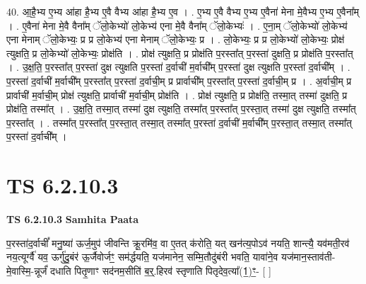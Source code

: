 \documentclass[17pt]{extarticle}
\begin{document}
40. आ॒है॒भ्य ए॒भ्य आ॑हा है॒भ्य ए॒वै वैभ्य आ॑हा है॒भ्य ए॒व । . ए॒भ्य ए॒वै वैभ्य ए॒भ्य ए॒वैना॑ मेना मे॒वैभ्य ए॒भ्य ए॒वैना᳚म् । . ए॒वैना॑ मेना मे॒वै वैना᳚म् ॅलो॒केभ्यो॑ लो॒केभ्य॑ एना मे॒वै वैना᳚म् ॅलो॒केभ्यः॑ । . ए॒ना॒म् ॅलो॒केभ्यो॑ लो॒केभ्य॑ एना मेनाम् ॅलो॒केभ्यः॒ प्र प्र लो॒केभ्य॑ एना मेनाम् ॅलो॒केभ्यः॒ प्र । . लो॒केभ्यः॒ प्र प्र लो॒केभ्यो॑ लो॒केभ्यः॒ प्रोक्ष॑ त्युक्षति॒ प्र लो॒केभ्यो॑ लो॒केभ्यः॒ प्रोक्ष॑ति । . प्रोक्ष॑ त्युक्षति॒ प्र प्रोक्ष॑ति प॒रस्ता᳚त् प॒रस्ता॑ दुक्षति॒ प्र प्रोक्ष॑ति प॒रस्ता᳚त् । . उ॒क्ष॒ति॒ प॒रस्ता᳚त् प॒रस्ता॑ दुक्ष त्युक्षति प॒रस्ता॑ द॒र्वाची॑ म॒र्वाची᳚म् प॒रस्ता॑ दुक्ष त्युक्षति प॒रस्ता॑ द॒र्वाची᳚म् । . प॒रस्ता॑ द॒र्वाची॑ म॒र्वाची᳚म् प॒रस्ता᳚त् प॒रस्ता॑ द॒र्वाची॒म् प्र प्रार्वाची᳚म् प॒रस्ता᳚त् प॒रस्ता॑ द॒र्वाची॒म् प्र । . अ॒र्वाची॒म् प्र प्रार्वाची॑ म॒र्वाची॒म् प्रोक्ष॑ त्युक्षति॒ प्रार्वाची॑ म॒र्वाची॒म् प्रोक्ष॑ति । . प्रोक्ष॑ त्युक्षति॒ प्र प्रोक्ष॑ति॒ तस्मा॒त् तस्मा॑ दुक्षति॒ प्र प्रोक्ष॑ति॒ तस्मा᳚त् । . उ॒क्ष॒ति॒ तस्मा॒त् तस्मा॑ दुक्ष त्युक्षति॒ तस्मा᳚त् प॒रस्ता᳚त् प॒रस्ता॒त् तस्मा॑ दुक्ष त्युक्षति॒ तस्मा᳚त् प॒रस्ता᳚त् । . तस्मा᳚त् प॒रस्ता᳚त् प॒रस्ता॒त् तस्मा॒त् तस्मा᳚त् प॒रस्ता॑ द॒र्वाची॑ म॒र्वाची᳚म् प॒रस्ता॒त् तस्मा॒त् तस्मा᳚त् प॒रस्ता॑ द॒र्वाची᳚म् । \newline
\pagebreak
{}

\section{ TS 6.2.10.3 }

\textbf{TS 6.2.10.3 } \newline
\textbf{Samhita Paata} \newline

प॒रस्ता॑द॒र्वाचीं᳚ मनु॒ष्या॑ ऊर्ज॒मुप॑ जीवन्ति क्रू॒रमि॑व॒ वा ए॒तत् क॑रोति॒ यत् खन॑त्य॒पोऽव॑ नयति॒ शान्त्यै॒ यव॑मती॒रव॑ नय॒त्यूर्ग्वै॑ यव॒ ऊर्गु॑दु॒बंर॑ ऊ॒र्जैवोर्जꣳ॒॒ सम॑र्द्धयति॒ यज॑मानेन॒ सम्मि॒तौदु॑बंरी भवति॒ यावा॑ने॒व यज॑मान॒स्ताव॑ती-मे॒वास्मि॒-न्नूर्जं॑ दधाति पितृ॒णाꣳ सद॑नम॒सीति॑ ब॒र्॒.हिरव॑ स्तृणाति पितृदेव॒त्या᳚(1॒)ꣳ॒- [  ] \newline
\end{document}
